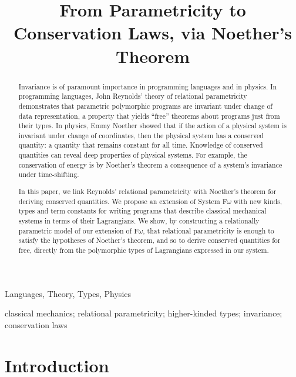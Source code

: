 \documentclass{sigplanconf}
\title{From Parametricity to Conservation Laws, via Noether's Theorem}
\theoremstyle{examplestyle}
\begin{document}
\exclusivelicense
{}

\maketitle

\begin{abstract}
  Invariance is of paramount importance in programming languages and
  in physics. In programming languages, John Reynolds' theory of
  relational parametricity demonstrates that parametric polymorphic
  programs are invariant under change of data representation, a
  property that yields ``free'' theorems about programs just from
  their types. In physics, Emmy Noether showed that if the action of a
  physical system is invariant under change of coordinates, then the
  physical system has a conserved quantity: a quantity that remains
  constant for all time. Knowledge of conserved quantities can reveal
  deep properties of physical systems. For example, the conservation
  of energy is by Noether's theorem a consequence of a system's
  invariance under time-shifting.

  In this paper, we link Reynolds' relational parametricity with
  Noether's theorem for deriving conserved quantities. We propose an
  extension of System F$\omega$ with new kinds, types and term
  constants for writing programs that describe classical mechanical
  systems in terms of their Lagrangians. We show, by constructing a
  relationally parametric model of our extension of F$\omega$, that
  relational parametricity is enough to satisfy the hypotheses of
  Noether's theorem, and so to derive conserved quantities for free,
  directly from the polymorphic types of Lagrangians expressed in our
  system.
\end{abstract}


\terms
  Languages, Theory, Types, Physics

\keywords
  classical mechanics; relational parametricity; higher-kinded types; invariance; conservation laws

\section{Introduction}
\end{document}
